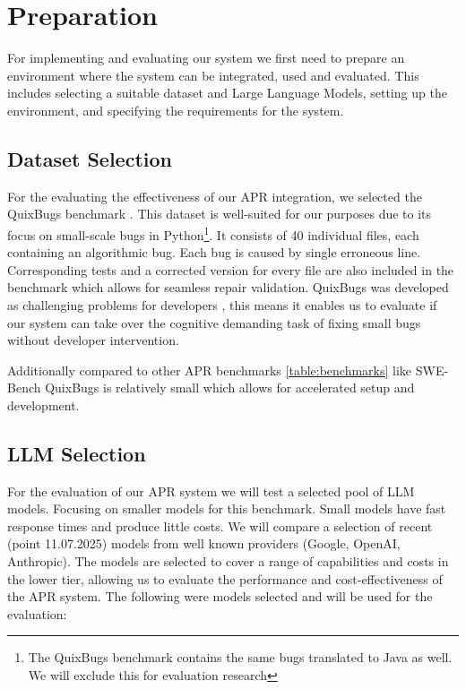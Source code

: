 \section{Preparation}

For implementing and evaluating our system we first need to prepare an environment where the system can be integrated, used and evaluated. This includes selecting a suitable dataset and Large Language Models, setting up the environment, and specifying the requirements for the system.

\subsection{Dataset Selection}

For the evaluating the effectiveness of our APR integration, we selected the QuixBugs benchmark \cite{linQuixBugsMultilingualProgram2017}. This dataset is well-suited for our purposes due to its focus on small-scale bugs in Python\footnote{The QuixBugs benchmark contains the same bugs translated to Java as well. We will exclude this for evaluation research}. It consists of 40 individual files, each containing an algorithmic bug. Each bug is caused by single erroneous line. Corresponding tests and a corrected version for every file are also included in the benchmark which allows for seamless repair validation. QuixBugs was developed as challenging problems for developers \cite{linQuixBugsMultilingualProgram2017}, this means it enables us to evaluate if our system can take over the cognitive demanding task of fixing small bugs without developer intervention.

Additionally compared to other APR benchmarks \ref{table:benchmarks} like SWE-Bench \cite{jimenezSWEbenchCanLanguage2024} QuixBugs is relatively small which allows for accelerated setup and development.

\subsection{LLM Selection} \label{subsection:llm-selection}

For the evaluation of our APR system we will test a selected pool of LLM models. Focusing on  smaller models for this benchmark. Small models have fast response times and produce little costs. We will compare a selection of recent (point 11.07.2025) models from well known providers (Google, OpenAI, Anthropic). The models are selected to cover a range of capabilities and costs in the lower tier, allowing us to evaluate the performance and cost-effectiveness of the APR system. The following were models selected and will be used for the evaluation:

